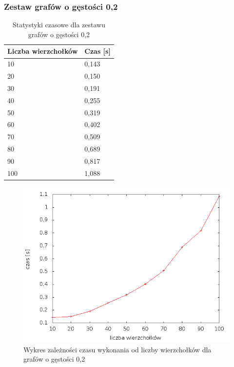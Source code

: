 \documentclass[12pt, a4paper]{article}
\begin{document}
\subsubsection*{Zestaw grafów o gęstości 0,2}
\begin{table}[H]
\caption{Statystyki czasowe dla zestawu grafów o gęstości 0,2}
\begin{center}
    \begin{tabular}{|l|l|}
    \hline
    Liczba wierzchołków & Czas [s] \\ \hline
    10 & 0,143 \\ \hline
    20 & 0,150 \\ \hline
    30 & 0,191 \\ \hline
    40 & 0,255 \\ \hline
    50 & 0,319 \\ \hline
    60 & 0,402 \\ \hline
    70 & 0,509 \\ \hline
    80 & 0,689 \\ \hline
    90 & 0,817 \\ \hline
    100 & 1,088 \\ \hline
    \end{tabular}
\end{center}
\end{table}

\begin{figure}[h]
    \begin{center}
	\includegraphics[scale=0.5]{results/img/den/den_02.png}
	\caption{Wykres zależności czasu wykonania od liczby wierzchołków dla grafów o gęstości 0,2}
    \end{center}
\end{figure}
\end{document}
